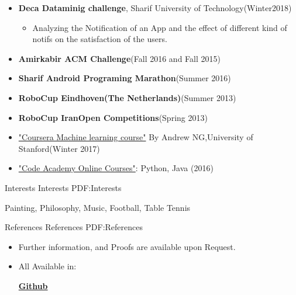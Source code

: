 \documentclass[letterpaper,MMMyyyy,nonstopmode]{simpleresumecv}
\begin{document}
\begin{Body}
\begin{itemize}
		

\item \textbf {Deca Dataminig challenge}, Sharif University of Technology(Winter2018)
 \begin{itemize}
	   
     \item Analyzing the Notification of an App and the effect of different kind of notifs on the satisfaction of the users.
    
   
    \end{itemize}
	
\item \textbf {Amirkabir ACM Challenge}(Fall 2016 and Fall 2015)
    	
\item \textbf {Sharif Android Programing Marathon}(Summer 2016)

\item \textbf {RoboCup Eindhoven(The Netherlands)}(Summer 2013)
	
\item \textbf {RoboCup IranOpen Competitions}(Spring 2013)

	 
	  \item  \href {https://www.coursera.org/learn/machine-learning/home/welcome}{"Coursera Machine learning course"}  By Andrew NG,University of Stanford(Winter 2017)
	  
	  \item  \href {https://www.codecademy.com/learn} {"Code Academy Online Courses"}: Python, Java  (2016)
            
     
\end{itemize}



\Section
{Interests}
{Interests}
{PDF:Interests}

\Entry
Painting,
Philosophy,
Music,
Football,
Table Tennis

\Section
{References}
{References}
{PDF:References}

\Entry
\begin{itemize}
\item
Further information, and Proofs are available upon Request.
\item
All Available in:

\href{https://github.com/msafari18} {\textbf{Github}}  




\end{itemize}









\end{Body}

\end{document}
